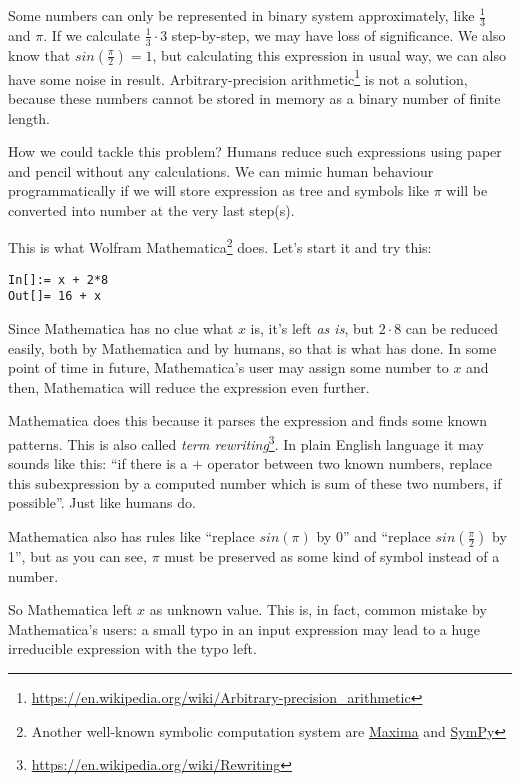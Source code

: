 
\leveldown{}

Some numbers can only be represented in binary system approximately, like $\frac{1}{3}$ and $\pi$.
If we calculate $\frac{1}{3} \cdot 3$ step-by-step, we may have loss of significance.
We also know that $sin(\frac{\pi}{2}) = 1$, but calculating this expression in usual way,
we can also have some noise in result.
Arbitrary-precision arithmetic\footnote{\url{https://en.wikipedia.org/wiki/Arbitrary-precision_arithmetic}} is not a solution,
because these numbers cannot be stored in memory as a binary number of finite length.

How we could tackle this problem?
Humans reduce such expressions using paper and pencil without any calculations.
We can mimic human behaviour programmatically if we will store expression as tree and symbols like $\pi$ will be converted into number at the very last step(s).

This is what Wolfram Mathematica\footnote{Another well-known symbolic computation system are 
\href{https://en.wikipedia.org/wiki/Maxima_\%28software\%29}{Maxima} and 
\href{https://en.wikipedia.org/wiki/SymPy}{SymPy}} does.
Let's start it and try this:

\begin{lstlisting}
In[]:= x + 2*8
Out[]= 16 + x
\end{lstlisting}

Since Mathematica has no clue what $x$ is, it's left \textit{as is}, but $2 \cdot 8$ can be reduced easily, both by Mathematica and by humans,
so that is what has done.
In some point of time in future, Mathematica's user may assign some number to $x$ and then, Mathematica will reduce the expression even further.

Mathematica does this because it parses the expression and finds some known patterns.
This is also called \textit{term rewriting}\footnote{\url{https://en.wikipedia.org/wiki/Rewriting}}.
In plain English language it may sounds like this:
``if there is a $+$ operator between two known numbers, replace this subexpression by a computed number which is sum of these two numbers, if possible''.
Just like humans do.

Mathematica also has rules like ``replace $sin(\pi)$ by 0'' and ``replace $sin(\frac{\pi}{2})$ by 1'', but as you can see, $\pi$ must be preserved
as some kind of symbol instead of a number.

So Mathematica left $x$ as unknown value.
This is, in fact, common mistake by Mathematica's users: a small typo in an input expression may lead to a huge irreducible expression with the typo left.

